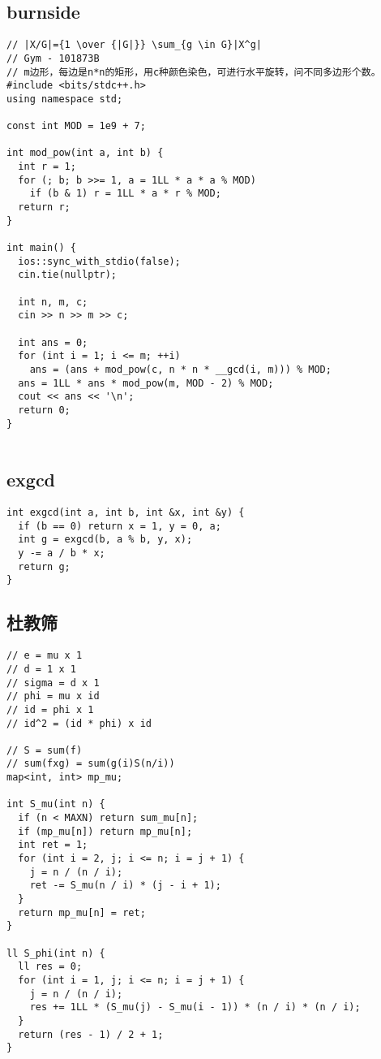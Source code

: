 \documentclass[twoside]{article}
\begin{document}
\subsection{burnside}
\begin{lstlisting}
// |X/G|={1 \over {|G|}} \sum_{g \in G}|X^g|
// Gym - 101873B
// m边形，每边是n*n的矩形，用c种颜色染色，可进行水平旋转，问不同多边形个数。
#include <bits/stdc++.h>
using namespace std;

const int MOD = 1e9 + 7;

int mod_pow(int a, int b) {
  int r = 1;
  for (; b; b >>= 1, a = 1LL * a * a % MOD)
    if (b & 1) r = 1LL * a * r % MOD;
  return r;
}

int main() {
  ios::sync_with_stdio(false);
  cin.tie(nullptr);

  int n, m, c;
  cin >> n >> m >> c;

  int ans = 0;
  for (int i = 1; i <= m; ++i)
    ans = (ans + mod_pow(c, n * n * __gcd(i, m))) % MOD;
  ans = 1LL * ans * mod_pow(m, MOD - 2) % MOD;
  cout << ans << '\n';
  return 0;
}


\end{lstlisting}
\subsection{exgcd}
\begin{lstlisting}
int exgcd(int a, int b, int &x, int &y) {
  if (b == 0) return x = 1, y = 0, a;
  int g = exgcd(b, a % b, y, x);
  y -= a / b * x;
  return g;
}

\end{lstlisting}
\subsection{杜教筛}
\begin{lstlisting}
// e = mu x 1
// d = 1 x 1
// sigma = d x 1
// phi = mu x id
// id = phi x 1
// id^2 = (id * phi) x id

// S = sum(f)
// sum(fxg) = sum(g(i)S(n/i))
map<int, int> mp_mu;

int S_mu(int n) {
  if (n < MAXN) return sum_mu[n];
  if (mp_mu[n]) return mp_mu[n];
  int ret = 1;
  for (int i = 2, j; i <= n; i = j + 1) {
    j = n / (n / i);
    ret -= S_mu(n / i) * (j - i + 1);
  }
  return mp_mu[n] = ret;
}

ll S_phi(int n) {
  ll res = 0;
  for (int i = 1, j; i <= n; i = j + 1) {
    j = n / (n / i);
    res += 1LL * (S_mu(j) - S_mu(i - 1)) * (n / i) * (n / i);
  }
  return (res - 1) / 2 + 1;
}

\end{lstlisting}
\end{document}

